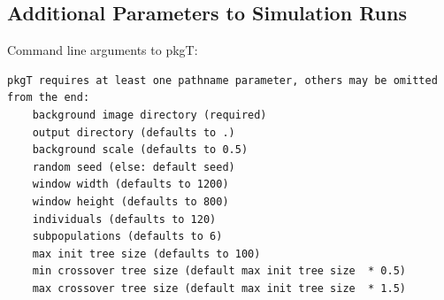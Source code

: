 \documentclass[acmtog,
    anonymous,
    review
    ]{acmart}
\begin{document}
\subsection{Additional Parameters to Simulation Runs}
\begin{minipage}{\linewidth}
Command line arguments to pkgT:
\par
\begin{small}
\hspace*{1cm}
\begin{minipage}{\linewidth-1.1cm}
\begin{verbatim}
pkgT requires at least one pathname parameter, others may be omitted from the end:
    background image directory (required)
    output directory (defaults to .)
    background scale (defaults to 0.5)
    random seed (else: default seed)
    window width (defaults to 1200)
    window height (defaults to 800)
    individuals (defaults to 120)
    subpopulations (defaults to 6)
    max init tree size (defaults to 100)
    min crossover tree size (default max init tree size  * 0.5)
    max crossover tree size (default max init tree size  * 1.5)
\end{verbatim}
\end{minipage}
\end{small}
\end{minipage}
\end{document}
